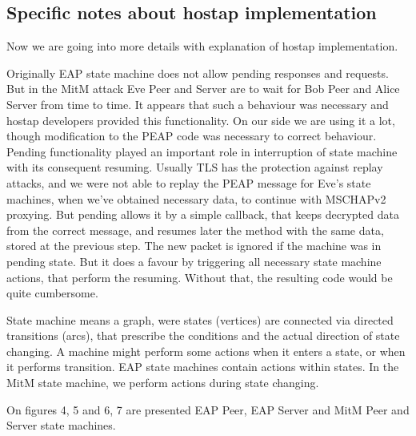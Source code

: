 \documentclass{amsart}
\begin{document}
\subsection{Specific notes about hostap implementation}

Now we are going into more details with explanation of hostap implementation.

Originally EAP state machine does not allow pending responses
and requests. But in the MitM attack
Eve Peer and Server are to wait for Bob Peer and Alice Server from time to time.
It appears that such a behaviour was necessary and hostap developers provided
this functionality.
On our side we are using it a lot,
though modification to the PEAP
code was necessary to correct behaviour.
Pending functionality played an important role in interruption of state machine
with its consequent resuming.
Usually TLS has the protection against replay attacks,
and we were not able to replay the PEAP message for Eve's state machines,
when we've obtained necessary data,
to continue with MSCHAPv2 proxying.
But pending allows it by a simple callback,
that keeps decrypted data from the correct message,
and resumes later the method with the same data,
stored at the previous step.
The new packet is ignored if the machine was in pending state.
But it does a favour by triggering all necessary state machine
actions, that perform the resuming. Without that,
the resulting code would be quite cumbersome.

State machine means a graph, were states (vertices) are connected
via directed transitions (arcs), that prescribe the conditions
and the actual direction of state changing.
A machine might perform some actions when it enters a state,
or when it performs transition.
EAP state machines contain actions within states.
In the MitM state machine, we perform actions during state changing.

On figures 4, 5 and 6, 7 are presented EAP Peer, EAP Server and MitM Peer
and Server state machines.
\end{document}
